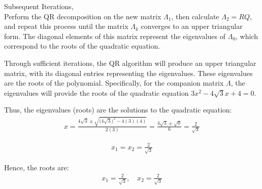 \documentclass[journal]{IEEEtran}
\begin{document}
Subsequent Iterations,\\
Perform the QR decomposition on the new matrix \( \Lambda_1 \), then calculate \( \Lambda_2 = RQ \), and repeat this process until the matrix \( \Lambda_k \) converges to an upper triangular form. The diagonal elements of this matrix represent the eigenvalues of \( \Lambda_0 \), which correspond to the roots of the quadratic equation.

Through sufficient iterations, the QR algorithm will produce an upper triangular matrix, with its diagonal entries representing the eigenvalues. These eigenvalues are the roots of the polynomial. Specifically, for the companion matrix \( \Lambda \), the eigenvalues will provide the roots of the quadratic equation \( 3x^2 - 4\sqrt{3}x + 4 = 0 \).


Thus, the eigenvalues (roots) are the solutions to the quadratic equation:
\begin{align}    
x = \frac{4{\sqrt{3}} \pm \sqrt{{(4{\sqrt{3}}})^2 - 4(3)(4)}}{2(3)} = \frac{4{\sqrt{3}} \pm \sqrt{0}}{6} = \frac{2}{\sqrt{3}}
\end{align}

\begin{align}
x_1=x_2 = \frac{2}{\sqrt{3}}
\end{align}

Hence, the roots are:
\begin{align}
    x_1 = \frac{2}{\sqrt{3}}, \quad x_2 = \frac{2}{\sqrt{3}}
\end{align}
\end{document}
